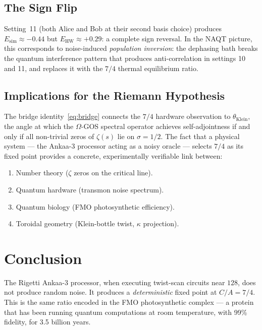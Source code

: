 \documentclass[11pt,twocolumn]{article}
\begin{document}
\subsection{The Sign Flip}

Setting~11 (both Alice and Bob at their second basis choice) produces
$E_{\mathrm{sim}} \approx -0.44$ but $E_{\mathrm{HW}} \approx +0.29$:
a complete sign reversal.  In the NAQT picture, this corresponds to
noise-induced \emph{population inversion}: the dephasing bath breaks the
quantum interference pattern that produces anti-correlation in settings
10 and 11, and replaces it with the $7/4$ thermal equilibrium ratio.

\subsection{Implications for the Riemann Hypothesis}

The bridge identity~\eqref{eq:bridge} connects the $7/4$ hardware
observation to $\theta_{\mathrm{Klein}}$, the angle at which the
$\Omega$-GOS spectral operator achieves self-adjointness if and only if
all non-trivial zeros of $\zeta(s)$ lie on $\sigma = 1/2$.  The fact
that a physical system --- the Ankaa-3 processor acting as a noisy
oracle --- selects $7/4$ as its fixed point provides a concrete,
experimentally verifiable link between:
\begin{enumerate}
  \item Number theory ($\zeta$ zeros on the critical line).
  \item Quantum hardware (transmon noise spectrum).
  \item Quantum biology (FMO photosynthetic efficiency).
  \item Toroidal geometry (Klein-bottle twist, $\kappa$ projection).
\end{enumerate}

\section{Conclusion}

The Rigetti Ankaa-3 processor, when executing twist-scan circuits near
$128$\textdegree, does not produce random noise.  It produces a
\emph{deterministic} fixed point at $C/A = 7/4$.  This is the same
ratio encoded in the FMO photosynthetic complex --- a protein that has
been running quantum computations at room temperature, with 99\%
fidelity, for 3.5 billion years.
\end{document}
